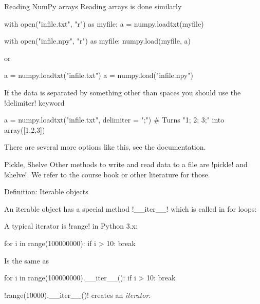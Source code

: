\documentclass[hyperref={pdfpagelabels=false},table]{beamer}
\begin{document}
\begin{frame}[fragile]{Reading NumPy arrays}
Reading arrays is done similarly
\begin{python}
with open("infile.txt", "r") as myfile:
  a = numpy.loadtxt(myfile)

with open("infile.npy", "r") as myfile:
  numpy.load(myfile, a)
\end{python}
or
\begin{python}
a = numpy.loadtxt("infile.txt")
a = numpy.load("infile.npy") 
\end{python}
If the data is separated by something other than spaces you should use the \pyth!delimiter! keyword
\begin{python}
a = numpy.loadtxt("infile.txt", delimiter = ";")
# Turns "1; 2; 3;" into array([1,2,3])
\end{python}
There are several more options like this, see the documentation.
\end{frame}
\begin{frame}[fragile]{Pickle, Shelve}
\vfill
Other methods to write and read data to a file are \pyth!pickle! and \pyth!shelve!.
We refer to the course book or other literature for those.
\vfill
\end{frame}
\begin{frame}[fragile]{Definition: Iterable objects}
\begin{defblock}
An iterable object has a special method \pyth!__iter__! which is called in for loops:
\end{defblock}

\begin{example}
A typical iterator is \pyth!range! in Python 3.x:
\begin{python}
for i in range(100000000):
   if i > 10:
    break
\end{python}

Is the same as 
\begin{python}
for i in range(100000000).__iter__():
  if i > 10:
    break
\end{python}
\pyth!range(10000).__iter__()! creates an \emph{iterator}.
\end{example}
\end{frame}
\end{document}
